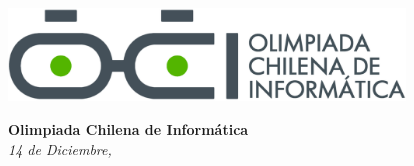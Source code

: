 \documentclass[12pt]{oci}
\begin{document}
  \begin{center}
  \includegraphics[height=70pt]{logo.eps}

  \vskip 70pt
  \Large{\bf Olimpiada Chilena de Inform\'atica\\ \the\year}
  \vskip 10pt
  \large{\phase}
  \vskip 10pt
  \normalsize{\it 14 de Diciembre, \the\year}

  \vskip 85pt

\end{center} %
\end{document}
